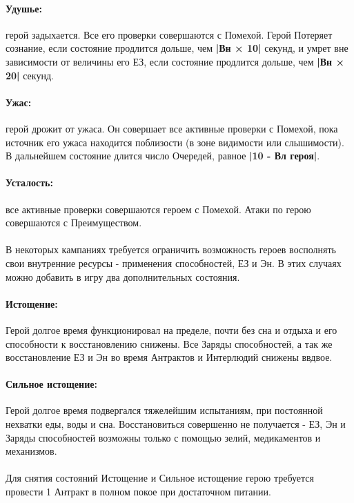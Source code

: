 \paragraph{Удушье:} герой задыхается. Все его проверки совершаются с Помехой. Герой Потеряет сознание, если состояние продлится дольше, чем \textbf{|Вн × 10|} секунд, и умрет вне зависимости от величины его ЕЗ, если состояние продлится дольше, чем \textbf{|Вн × 20|} секунд.
\paragraph{Ужас:} герой дрожит от ужаса. Он совершает все активные проверки с Помехой, пока источник его ужаса находится поблизости (в зоне видимости или слышимости). В дальнейшем состояние длится число Очередей, равное \textbf{|10 - Вл героя|}.
\paragraph{Усталость:} все активные проверки совершаются героем с Помехой. Атаки по герою совершаются с Преимуществом.
\begin{tcolorbox}
\paragraph{} В некоторых кампаниях требуется ограничить возможность героев восполнять свои внутренние ресурсы - применения способностей, ЕЗ и Эн. В этих случаях можно добавить в игру два дополнительных состояния.
\paragraph{Истощение:} Герой долгое время функционировал на пределе, почти без сна и отдыха и его способности к восстановлению снижены. Все Заряды способностей, а так же восстановление ЕЗ и Эн во время Антрактов и Интерлюдий снижены ввдвое.
\paragraph{Сильное истощение:} Герой долгое время подвергался тяжелейшим испытаниям, при постоянной нехватки еды, воды и сна. Восстановиться совершенно не получается - ЕЗ, Эн и Заряды способностей возможны только с помощью зелий, медикаментов и механизмов.
\paragraph{} Для снятия состояний Истощение и Сильное истощение герою требуется провести 1 Антракт в полном покое при достаточном питании.
\end{tcolorbox}